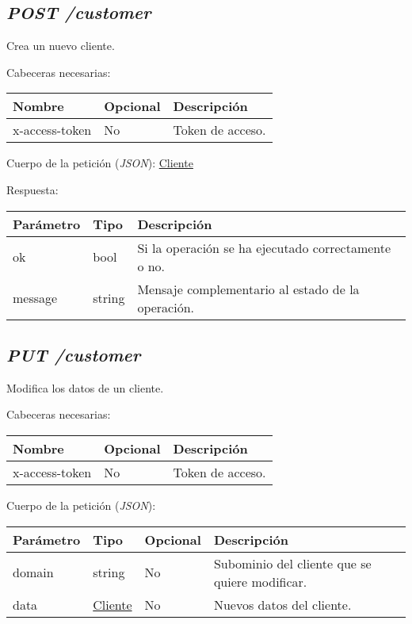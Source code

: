 \subsection{\textit{POST /customer}}
Crea un nuevo cliente.

Cabeceras necesarias:
\begin{table}[h!]
	\centering
	\begin{tabular}{|l|l|l|}
		\hline
		Nombre & Opcional & Descripción \\ \hline
		x-access-token & No & Token de acceso. \\ \hline
	\end{tabular}
\end{table}

Cuerpo de la petición (\textit{JSON}): \hyperref[sec:cliente]{Cliente}


Respuesta:
\begin{table}[h!]
	\centering
	\begin{adjustbox}{max width=\textwidth}
	\begin{tabular}{|l|l|l|}
		\hline
		Parámetro & Tipo & Descripción \\ \hline
		ok & bool & Si la operación se ha ejecutado correctamente o no. \\ \hline
		message & string & Mensaje complementario al estado de la operación. \\ \hline
	\end{tabular}
\end{adjustbox}
\end{table}



\subsection{\textit{PUT /customer}}
Modifica los datos de un cliente.

Cabeceras necesarias:
\begin{table}[h!]
	\centering
	\begin{adjustbox}{max width=\textwidth}
	\begin{tabular}{|l|l|l|}
		\hline
		Nombre & Opcional & Descripción \\ \hline
		x-access-token & No & Token de acceso. \\ \hline
	\end{tabular}
\end{adjustbox}
\end{table}

Cuerpo de la petición (\textit{JSON}):
\begin{table}[h!]
	\centering
	\begin{adjustbox}{max width=\textwidth}
	\begin{tabular}{|l|l|l|l|}
		\hline
		Parámetro & Tipo & Opcional & Descripción \\ \hline
		domain & string & No & Subominio del cliente que se quiere modificar. \\ \hline
		data & \hyperref[sec:cliente]{Cliente} & No & Nuevos datos del cliente. \\ \hline
	\end{tabular}
\end{adjustbox}
\end{table}

